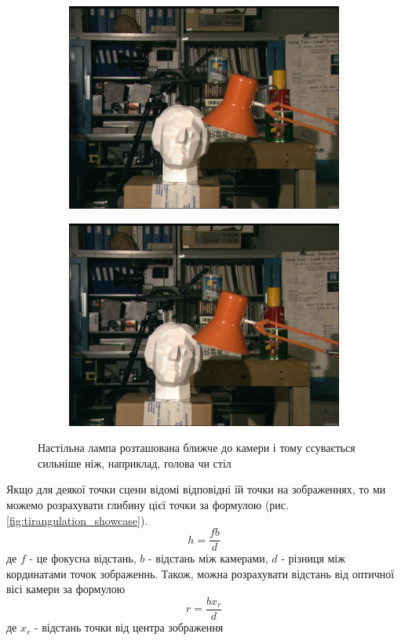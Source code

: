 \documentclass[11pt]{article}
\theoremstyle{definition}
\begin{document}
\begin{figure}[h]
	\begin{subfigure}{.5\textwidth}
		\includegraphics[width=0.9\linewidth]{disparity_example_left}
		\centering
	\end{subfigure}
	\begin{subfigure}{.5\textwidth}
		\includegraphics[width=0.9\linewidth]{disparity_example_right}
		\centering
	\end{subfigure}
	\caption{Настільна лампа розташована ближче до камери і тому ссувається сильніше ніж, наприклад, голова чи стіл}
	\centering
	\label{fig:tsukuba_stereopair}
\end{figure}

Якщо для деякої точки сцени відомі відповідні їй точки на зображеннях, то ми можемо розрахувати глибину цієї точки за формулою (рис. \ref{fig:tirangulation_showcase}). 
\[ h = \frac{fb}{d} \]
де $f$ - це фокусна відстань, $b$ - відстань між камерами, $d$ - різниця між кординатами точок зображеннь. Також, можна розрахувати відстань від оптичної вісі камери за формулою
\[ r = \frac{bx_r}{d} \]
де $x_r$ - відстань точки від центра зображення
\end{document}
